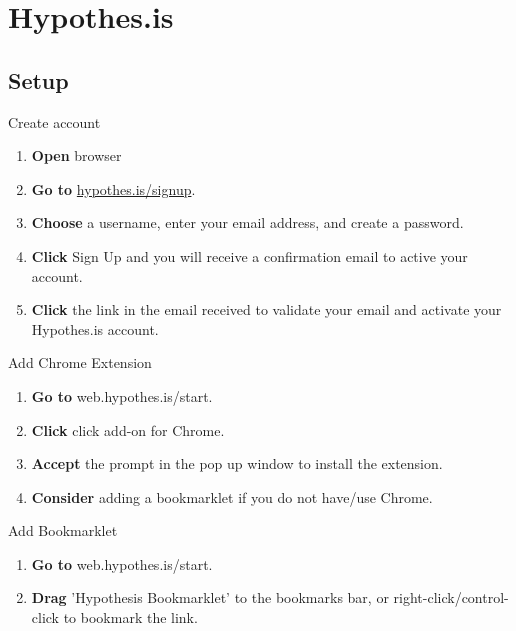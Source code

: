 \documentclass[10pt,a4paper]{article}
\begin{document}


\section{Hypothes.is}
\subsection{Setup}

\begin{textbox}{Create account}
 

  

\begin{enumerate}
\item \textbf{Open} browser
\item \textbf{Go to} \href{hypothes.is/signup}{hypothes.is/signup}. 
\item \textbf{Choose} a username, enter your email address, and create a password.
\item \textbf{Click} Sign Up and you will receive a confirmation email to active your account.
\item \textbf{Click} the link in the email received to validate your email and activate your Hypothes.is account.
\end{enumerate}

\end{textbox}

\begin{textbox}{Add Chrome Extension}
 

  

\begin{enumerate}
\item \textbf{Go to} web.hypothes.is/start. 
\item \textbf{Click} click add-on for Chrome.
\item \textbf{Accept} the prompt in the pop up window to install the extension. 
\item \textbf{Consider} adding a bookmarklet if you do not have/use Chrome.
\end{enumerate}

\end{textbox}

\begin{textbox}{Add Bookmarklet}
 

  

\begin{enumerate}
\item \textbf{Go to} web.hypothes.is/start. 
\item \textbf{Drag} 'Hypothesis Bookmarklet' to the bookmarks bar, or right-click/control-click to bookmark the link.
\end{enumerate}

\end{textbox}
\end{document}
